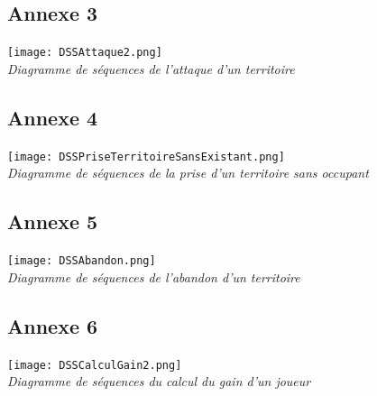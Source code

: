 \documentclass[a4paper, 11pt]{article}
\begin{document}
\begin{appendix}
		\newpage
		
		\subsection*{Annexe 3}
		
		\begin{center}
			\texttt{[image: DSSAttaque2.png]}\\
			\emph{Diagramme de séquences de l'attaque d'un territoire}
		\end{center}
		
		\newpage
		
		
		\subsection*{Annexe 4}
		
		\begin{center}
			\texttt{[image: DSSPriseTerritoireSansExistant.png]}\\
			\emph{Diagramme de séquences de la prise d'un territoire sans occupant}
		\end{center}
		
		\newpage


		\subsection*{Annexe 5}
		
		\begin{center}
		\vspace*{3cm}
			\texttt{[image: DSSAbandon.png]}\\
			\emph{Diagramme de séquences de l'abandon d'un territoire}
		\end{center}
		
		\newpage


		\subsection*{Annexe 6}
		
		\begin{center}
			\texttt{[image: DSSCalculGain2.png]}\\
			\emph{Diagramme de séquences du calcul du gain d'un joueur}
		\end{center}

		\newpage

		
	\end{appendix}
		
	\tableofcontents
		
\end{document}
